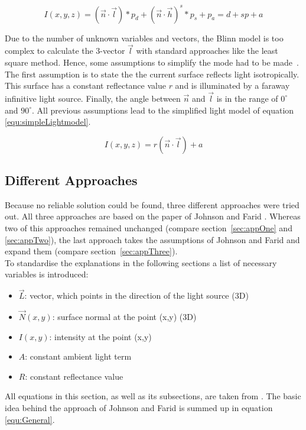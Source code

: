 \begin{equation}
\label{equ:Blinn}
I(x,y,z) = (\vec{n}\cdot \vec{l})*p_d + (\vec{n}\cdot\vec{h})^s*p_s + p_a = d + sp + a
\end{equation} 

Due to the number of unknown variables and vectors, the Blinn model is too complex to calculate the 3-vector $\vec{l}$ with standard approaches like the least square method. Hence, some assumptions to simplify the mode had to be made~\cite{Johnson}. The first assumption is to state the the current surface reflects light isotropically. This surface has a constant reflectance value $r$ and is illuminated by a faraway infinitive light source. Finally, the angle between $\vec{n}$ and  $\vec{l}$ is in the range of $0^\circ $ and $90^\circ$. All previous assumptions lead to the simplified light model of equation \ref{equ:simpleLightmodel}.

\begin{equation}
\label{equ:simpleLightmodel}
I(x,y,z) = r(\vec{n}\cdot \vec{l}) + a
\end{equation} 

\subsection{Different Approaches}\label{sec:approaches}
Because no reliable solution could be found, three different approaches were tried out. 
All three approaches are based on the paper of Johnson and Farid \cite{Johnson}. 
Whereas two of this approaches remained unchanged (compare section~\ref{sec:appOne} and \ref{sec:appTwo}), the last approach takes the assumptions of Johnson and Farid and expand them (compare section~\ref{sec:appThree}). \\
To standardise the explanations in the following sections a list of necessary variables is introduced: 
\begin{itemize}
\item $\vec{L}$: vector, which points in the direction of the light source (3D)
\item $\vec{N}(x,y)$: surface normal at the point (x,y) (3D)
\item $I(x,y)$: intensity at the point (x,y)
\item $A$: constant ambient light term
\item $R$: constant reflectance value
\end{itemize}
All equations in this section, as well as its subsections, are taken from \cite{Johnson}. The basic idea behind the approach of Johnson and Farid is summed up in equation \ref{equ:General}.

